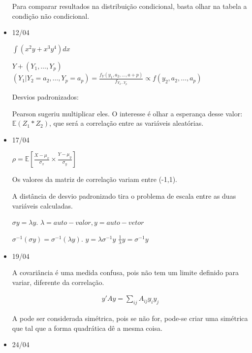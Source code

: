 \documentclass[11pt,a4paper]{book}
\begin{document}
\begin{itemize}
		 Para comparar resultados na distribuição condicional, basta olhar na tabela a condição não condicional.
		 
		 \item 12/04
		 
		 $\int (x^2y+x^3y^4)dx$
		 
		 $Y+(Y_1,\ldots,Y_p)$
		 $(Y_1|Y_2=a_2,\ldots,Y_p=a_p)=\frac{f_Y(y_1,a_2,\ldots,a+p)}{f_{Y_2\ldots Y_p}}\propto f(y_2,a_2,\ldots,a_p)$
		 
		 Desvios padronizados:
		 
		 Pearson sugeriu multiplicar eles.
		 O interesse é olhar a esperança desse valor: $\mathbb{E}(Z_1*Z_2)$, que será a correlação entre as variáveis aleatórias.
		 
		 \item 17/04
		 
		 $\rho=\mathbb{E}[\frac{X-\mu_x}{\sigma_x}\times\frac{Y-\mu_y}{\sigma_y}]$
		 
		 Os valores da matriz de correlação variam entre (-1,1).
		 
		 A distância de desvio padronizado tira o problema de escala entre as duas variáveis calculadas.
		 
		 $\sigma y=\lambda y$.
		 $\lambda= auto-valor, y=auto-vetor$
		 
		 
		 $\sigma^{-1}(\sigma y)=\sigma^{-1}(\lambda y)$.
		 $y=\lambda\sigma^{-1}y$
		 $\frac{1}{\lambda}y=\sigma^{-1}y$
		 
		 \item 19/04
		 
		 A covariância é uma medida confusa, pois não tem um limite definido para variar, diferente da correlação.
		 
		 \begin{eqnarray*}
		 	y'Ay=\sum_{ij}A_{ij}y_iy_j
		 \end{eqnarray*}
		 
		 A pode ser considerada simétrica, pois se não for, pode-se criar uma simétrica que tal que a forma quadrática dê a mesma coisa.
		 
		 \item 24/04
		 
		 		 
		 
	\end{itemize}
\end{document}
